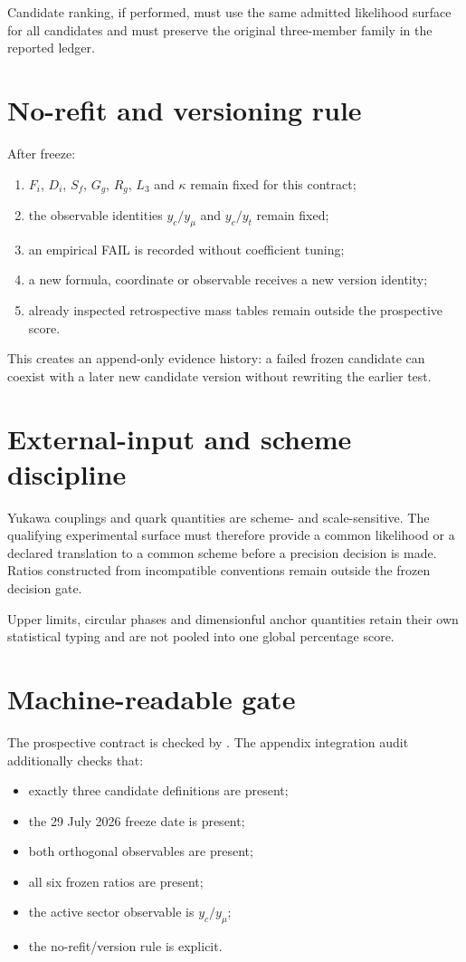 Candidate ranking, if performed, must use the same admitted likelihood surface
for all candidates and must preserve the original three-member family in the
reported ledger.

\section{No-refit and versioning rule}

After freeze:
\begin{enumerate}
\item \(F_i\), \(D_i\), \(S_f\), \(G_g\), \(R_g\), \(L_3\) and \(\kappa\) remain fixed for this contract;
\item the observable identities \(y_c/y_\mu\) and \(y_c/y_t\) remain fixed;
\item an empirical FAIL is recorded without coefficient tuning;
\item a new formula, coordinate or observable receives a new version identity;
\item already inspected retrospective mass tables remain outside the prospective score.
\end{enumerate}

This creates an append-only evidence history: a failed frozen candidate can
coexist with a later new candidate version without rewriting the earlier test.

\section{External-input and scheme discipline}

Yukawa couplings and quark quantities are scheme- and scale-sensitive.
The qualifying experimental surface must therefore provide a common likelihood
or a declared translation to a common scheme before a precision decision is
made.  Ratios constructed from incompatible conventions remain outside the
frozen decision gate.

Upper limits, circular phases and dimensionful anchor quantities retain their
own statistical typing and are not pooled into one global percentage score.

\section{Machine-readable gate}

The prospective contract is checked by
.
The appendix integration audit additionally checks that:
\begin{itemize}
\item exactly three candidate definitions are present;
\item the 29 July 2026 freeze date is present;
\item both orthogonal observables are present;
\item all six frozen ratios are present;
\item the active sector observable is \(y_c/y_\mu\);
\item the no-refit/version rule is explicit.
\end{itemize}

